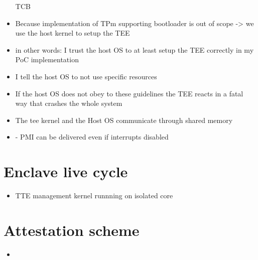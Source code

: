 \begin{itemize}
            TCB
      \item Because implementation of TPm supporting bootloader is out of scope ->
            we use the host kernel to setup the TEE
      \item in other words: I trust the host OS to at least setup the TEE
            correctly in my PoC implementation
      \item I tell the host OS to not use specific resources
      \item If the host OS does not obey to these guidelines the TEE reacts in a fatal way
            that crashes the whole system
      \item The tee kernel and the Host OS communicate through shared memory
      \item - PMI can be delivered even if interrupts disabled
\end{itemize}

\section{Enclave live cycle}
\begin{itemize}
      \item TTE management kernel runnning on isolated core
\end{itemize}

\section{Attestation scheme}
\begin{itemize}
      \item
\end{itemize}


\cleardoublepage

